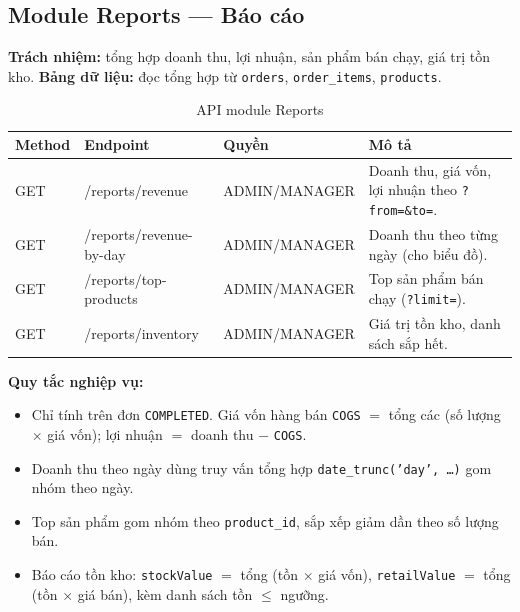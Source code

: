 \documentclass[12pt,a4paper]{report}
\begin{document}
\subsection{Module Reports --- Báo cáo}
\textbf{Trách nhiệm:} tổng hợp doanh thu, lợi nhuận, sản phẩm bán chạy, giá trị tồn kho. \textbf{Bảng dữ liệu:} đọc tổng hợp từ \texttt{orders}, \texttt{order\_items}, \texttt{products}.
\begin{table}[H]\centering\small
\begin{tabularx}{\textwidth}{|L{1.5cm}|L{3.6cm}|L{3.4cm}|X|}
\hline
\textbf{Method} & \textbf{Endpoint} & \textbf{Quyền} & \textbf{Mô tả} \\ \hline
GET & /reports/revenue & ADMIN/MANAGER & Doanh thu, giá vốn, lợi nhuận theo \texttt{?from=\&to=}. \\ \hline
GET & /reports/revenue-by-day & ADMIN/MANAGER & Doanh thu theo từng ngày (cho biểu đồ). \\ \hline
GET & /reports/top-products & ADMIN/MANAGER & Top sản phẩm bán chạy (\texttt{?limit=}). \\ \hline
GET & /reports/inventory & ADMIN/MANAGER & Giá trị tồn kho, danh sách sắp hết. \\ \hline
\end{tabularx}
\caption{API module Reports}
\end{table}
\textbf{Quy tắc nghiệp vụ:}
\begin{itemize}[leftmargin=1.4cm,nosep]
  \item Chỉ tính trên đơn \texttt{COMPLETED}. Giá vốn hàng bán \texttt{COGS} ${}={}$ tổng các (số lượng $\times$ giá vốn); lợi nhuận ${}={}$ doanh thu $-$ \texttt{COGS}.
  \item Doanh thu theo ngày dùng truy vấn tổng hợp \texttt{date\_trunc('day', \ldots)} gom nhóm theo ngày.
  \item Top sản phẩm gom nhóm theo \texttt{product\_id}, sắp xếp giảm dần theo số lượng bán.
  \item Báo cáo tồn kho: \texttt{stockValue} ${}={}$ tổng (tồn $\times$ giá vốn), \texttt{retailValue} ${}={}$ tổng (tồn $\times$ giá bán), kèm danh sách tồn $\le$ ngưỡng.
\end{itemize}
\end{document}
